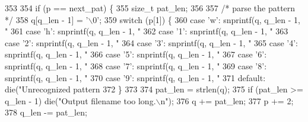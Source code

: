 \begin{DoxyCodeInclude}
{{{{{{{{{353 
354     \textcolor{keywordflow}{if} (p == next\_pat) \{
355       \textcolor{keywordtype}{size\_t} pat\_len;
356 
357       \textcolor{comment}{/* parse the pattern */}
358       q[q\_len - 1] = \textcolor{charliteral}{'\(\backslash\)0'};
359       \textcolor{keywordflow}{switch} (p[1]) \{
360         \textcolor{keywordflow}{case} \textcolor{charliteral}{'w'}: snprintf(q, q\_len - 1, \textcolor{stringliteral}{"%
361         \textcolor{keywordflow}{case} \textcolor{charliteral}{'h'}: snprintf(q, q\_len - 1, \textcolor{stringliteral}{"%
362         \textcolor{keywordflow}{case} \textcolor{charliteral}{'1'}: snprintf(q, q\_len - 1, \textcolor{stringliteral}{"%
363         \textcolor{keywordflow}{case} \textcolor{charliteral}{'2'}: snprintf(q, q\_len - 1, \textcolor{stringliteral}{"%
364         \textcolor{keywordflow}{case} \textcolor{charliteral}{'3'}: snprintf(q, q\_len - 1, \textcolor{stringliteral}{"%
365         \textcolor{keywordflow}{case} \textcolor{charliteral}{'4'}: snprintf(q, q\_len - 1, \textcolor{stringliteral}{"%
366         \textcolor{keywordflow}{case} \textcolor{charliteral}{'5'}: snprintf(q, q\_len - 1, \textcolor{stringliteral}{"%
367         \textcolor{keywordflow}{case} \textcolor{charliteral}{'6'}: snprintf(q, q\_len - 1, \textcolor{stringliteral}{"%
368         \textcolor{keywordflow}{case} \textcolor{charliteral}{'7'}: snprintf(q, q\_len - 1, \textcolor{stringliteral}{"%
369         \textcolor{keywordflow}{case} \textcolor{charliteral}{'8'}: snprintf(q, q\_len - 1, \textcolor{stringliteral}{"%
370         \textcolor{keywordflow}{case} \textcolor{charliteral}{'9'}: snprintf(q, q\_len - 1, \textcolor{stringliteral}{"%
371         \textcolor{keywordflow}{default}: die(\textcolor{stringliteral}{"Unrecognized pattern %
372       \}
373 
374       pat\_len = strlen(q);
375       \textcolor{keywordflow}{if} (pat\_len >= q\_len - 1) die(\textcolor{stringliteral}{"Output filename too long.\(\backslash\)n"});
376       q += pat\_len;
377       p += 2;
378       q\_len -= pat\_len;
}}}}}}}}}}}}}}}}}}}}}
\end{DoxyCodeInclude}
